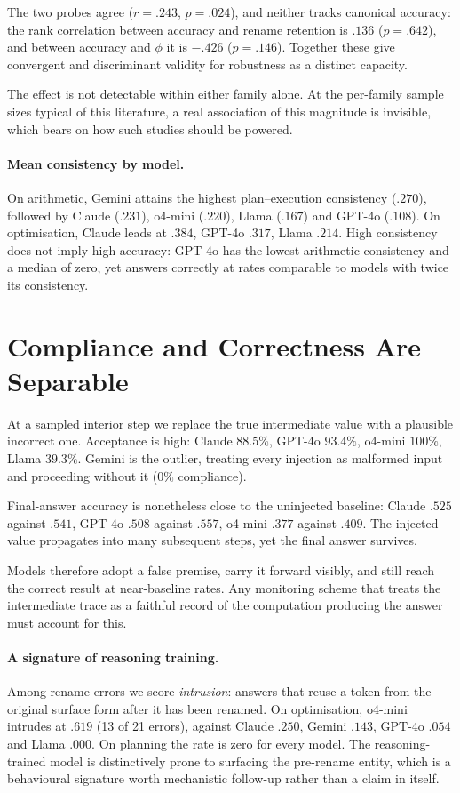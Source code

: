 \documentclass{article}
\begin{document}
The two probes agree ($r = .243$, $p = .024$), and neither tracks canonical
accuracy: the rank correlation between accuracy and rename retention is $.136$
($p = .642$), and between accuracy and $\phi$ it is $-.426$ ($p = .146$). Together
these give convergent and discriminant validity for robustness as a distinct
capacity.

The effect is not detectable within either family alone. At the per-family sample
sizes typical of this literature, a real association of this magnitude is invisible,
which bears on how such studies should be powered.

\paragraph{Mean consistency by model.} On arithmetic, Gemini attains the highest
plan--execution consistency ($.270$), followed by Claude ($.231$), o4-mini ($.220$),
Llama ($.167$) and GPT-4o ($.108$). On optimisation, Claude leads at $.384$,
GPT-4o $.317$, Llama $.214$. High consistency does not imply high accuracy: GPT-4o
has the lowest arithmetic consistency and a median of zero, yet answers correctly at
rates comparable to models with twice its consistency.

\section{Compliance and Correctness Are Separable}

At a sampled interior step we replace the true intermediate value with a plausible
incorrect one. Acceptance is high: Claude $88.5\%$, GPT-4o $93.4\%$, o4-mini
$100\%$, Llama $39.3\%$. Gemini is the outlier, treating every injection as
malformed input and proceeding without it ($0\%$ compliance).

Final-answer accuracy is nonetheless close to the uninjected baseline: Claude $.525$
against $.541$, GPT-4o $.508$ against $.557$, o4-mini $.377$ against $.409$. The
injected value propagates into many subsequent steps, yet the final answer survives.

Models therefore adopt a false premise, carry it forward visibly, and still reach the
correct result at near-baseline rates. Any monitoring scheme that treats the
intermediate trace as a faithful record of the computation producing the answer must
account for this.

\paragraph{A signature of reasoning training.} Among rename errors we score
\emph{intrusion}: answers that reuse a token from the original surface form after it
has been renamed. On optimisation, o4-mini intrudes at $.619$ (13 of 21 errors),
against Claude $.250$, Gemini $.143$, GPT-4o $.054$ and Llama $.000$. On planning
the rate is zero for every model. The reasoning-trained model is distinctively prone
to surfacing the pre-rename entity, which is a behavioural signature worth
mechanistic follow-up rather than a claim in itself.
\end{document}
